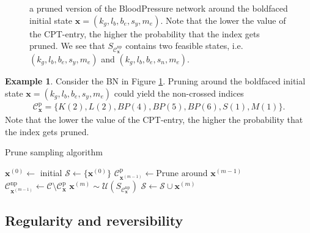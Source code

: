 \documentclass[a4paper, twoside, 11pt]{report}
\theoremstyle{plain}
\theoremstyle{definition}
\newtheorem{example}[thm]{Example}
\theoremstyle{remark}
\newcommand{\C}{{\mathcal C}}
\newcommand{\U}{{\mathcal{U}}}
\newcommand{\bfx}{{\mathbf{x}}}
\begin{document}
\begin{figure}[h!]
\begin{adjustbox}{width=\textwidth}
\end{adjustbox}
\caption{a pruned version of the BloodPressure network around the boldfaced initial state $\bfx = (k_g, l_b, b_e, s_y, m_e)$. Note that the lower the value of the CPT-entry, the higher the probability that the index gets pruned. We see that $S_{\C_\bfx^{\text{np}}}$ contains two feasible states, i.e. $(k_g, l_b, b_e, s_y, m_e)$ and $(k_g, l_b, b_e, s_n, m_e)$.}
\label{pruning}
\end{figure}

\begin{example}\label{ex:pruning}
Consider the BN in Figure \ref{pruning}. Pruning around the boldfaced initial state $\bfx = (k_g, l_b, b_e, s_y, m_e)$ could yield the non-crossed indices 
\begin{align*}
\C_\bfx^{\text{p}} = \{ K(2), L(2), BP(4), BP(5), BP(6), S(1), M(1) \}.
\end{align*}
Note that the lower the value of the CPT-entry, the higher the probability that the index gets pruned. 
\end{example}

\begin{algorithm}[h!]
\renewcommand\thealgorithm{1}
\caption{Prune sampling algorithm}
\label{prunealg}
\begin{algorithmic}
\State $\mathbf{x}^{(0)} \gets $ initial
     \State $\mathcal{S} \gets \{\mathbf{x}^{(0)}\}$
     \State $\C_{\bfx^{(m-1)}}^{\text{p}} \gets \text{Prune around } \mathbf{x}^{(m-1)}$ \\ 
	\State $\C_{\bfx^{(m-1)}}^{\text{np}} \gets \mathcal{C} \setminus \C_\bfx^{\text{p}}$  
     \State $\mathbf{x}^{(m)} \sim  \U(S_{\C_\bfx^{\text{np}}}) $ 
     \State $\mathcal{S} \gets \mathcal{S} \cup \mathbf{x}^{(m)}$
     \EndFor
     \State {}
\EndFunction
\end{algorithmic}
\end{algorithm}



\subsection{Regularity and reversibility}
\end{document}
